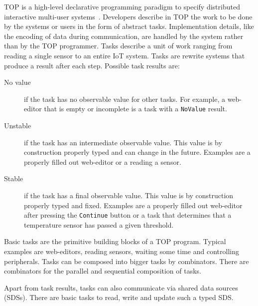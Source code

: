 \documentclass[runningheads]{llncs}
\newcommand{\CleanInline}[1]{\lstinline[language=Clean]!#1!}
\newcommand{\prog}[1]{\CleanInline{#1}}
\begin{document}
TOP is a high-level declarative programming paradigm to specify distributed interactive multi-user systems~\cite{TOP-ICFP07,plasmeijer_task-oriented_2012}.
Developers describe in TOP the work to be done by the systems or users in the form of abstract tasks.
Implementation details, like the encoding of data %
during communication, are handled by the system rather than by the TOP programmer. %
Tasks describe a unit of work ranging from reading a single sensor to an entire IoT system.
Tasks are rewrite systems that produce a result after each step. Possible task results are:
\begin{description}
\item[No value] if the task has no observable value for other tasks.
For example, a web-editor that is empty or incomplete is a task with a \prog{NoValue} result.
\item[Unstable] if the task has an intermediate observable value.
This value is by construction properly typed and can change in the future.
Examples are a properly filled out web-editor or a reading a sensor.
\item[Stable] if the task has a final observable value.
This value is by construction properly typed and fixed.
Examples are a properly filled out web-editor after pressing the \prog{Continue} button or a task that determines that a temperature sensor has passed a given threshold.
\end{description}

Basic tasks are the primitive building blocks of a TOP program.
Typical examples are web-editors, reading sensors, waiting some time and controlling peripherals.
Tasks can be composed into bigger tasks by combinators.
There are combinators for the parallel and sequential composition of tasks.

Apart from task results, tasks can also communicate via shared data sources (SDSs).
There are basic tasks to read, write and update such a typed {SDS}.


\end{document}
